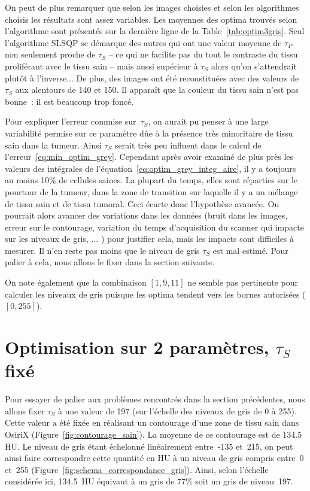\documentclass[main.tex]{subfiles}
\begin{document}
On peut de plus remarquer que selon les images choisies et selon les algorithmes choisis les résultats sont assez variables. Les moyennes des optima trouvés selon l'algorithme sont présentés sur la dernière ligne de la Table~\ref{tab:optim3gris}. Seul l'algorithme SLSQP se démarque des autres qui ont une valeur moyenne de $\tau_P$ non seulement proche de $\tau_S$ -- ce qui ne facilite pas du tout le contraste du tissu proliférant avec le tissu sain -- mais aussi supérieur à $\tau_S$ alors qu'on s'attendrait plutôt à l'inverse... De plus, des images ont été reconstituées avec des valeurs de $\tau_S$ aux alentours de 140 et 150. Il apparaît que la couleur du tissu sain n'est pas bonne~: il est beaucoup trop foncé.


Pour expliquer l'erreur commise sur~$\tau_S$, on aurait pu penser à une large variabilité permise sur ce paramètre dûe à la présence très minoritaire de tissu sain dans la tumeur. Ainsi $\tau_S$ serait très peu influent dans le calcul de l'erreur~\eqref{eq:min_optim_grey}. Cependant après avoir examiné de plus près les valeurs des intégrales de l'équation~\eqref{eq:optim_grey_integ_aire}, il y a toujours au moins 10\% de cellules saines. La plupart du temps, elles sont réparties sur le pourtour de la tumeur, dans la zone de transition sur laquelle il y a un mélange de tissu sain et de tissu tumoral. Ceci écarte donc l'hypothèse avancée. On pourrait alors avancer des variations dans les données (bruit dans les images, erreur sur le contourage, variation du temps d'acquisition du scanner qui impacte sur les niveaux de gris, ... ) pour justifier cela, mais les impacts sont difficiles à mesurer. 
Il n'en reste pas moins que le niveau de gris $\tau_S$ est mal estimé. 
Pour palier à cela, nous allons le fixer dans la section suivante.

On note également que la combinaison $[1,9,11]$ ne semble pas pertinente pour calculer les niveaux de gris puisque les optima tendent vers les bornes autorisées ($[0,255]$).

\section{Optimisation sur 2 paramètres, $\tau_S$ fixé}
Pour essayer de palier aux problèmes rencontrés dans la section précédentes, nous allons fixer $\tau_S$ à une valeur de 197 (sur l'échelle des niveaux de gris de 0 à 255). Cette valeur a été fixée en réalisant un contourage d'une zone de tissu sain dans OsiriX (\cf  Figure~\ref{fig:contourage_sain}). La moyenne de ce contourage est de 134.5 HU. Le niveau de gris étant échelonné linéairement entre~-135 et~215, on peut ainsi faire correspondre cette quantité en HU à un niveau de gris compris entre~0 et~255 (\cf Figure~\ref{fig:schema_correspondance_gris}). Ainsi, selon l'échelle considérée ici, 134.5~HU équivaut à un gris de 77\% soit un gris de niveau~197.
\end{document}
